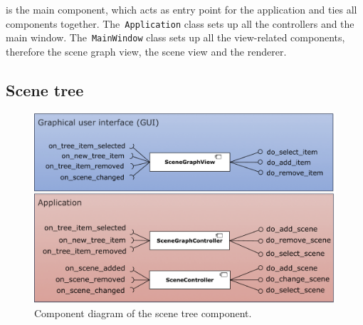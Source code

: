 \documentclass[%
    a4paper,    %
    justified,  %
    nobib,      %
    openany     %
]{tufte-book}
\begin{document}
 is the main component, which acts as entry
point for the application and ties all components together.
The~\verb=Application= class sets up all the controllers and the main window.
The~\verb=MainWindow= class sets up all the view-related components, therefore
the scene graph view, the scene view and the renderer.


\subsection{Scene tree}
\label{results:subsec:program:scene-tree}

\begin{figure}[ht]
  \caption{Component diagram of the scene tree component.}
  \label{fig:scene-graph-component-diagram}
  \includegraphics[width=0.95\linewidth]{images/scene-graph-component-diagram}
\end{figure}
\end{document}
